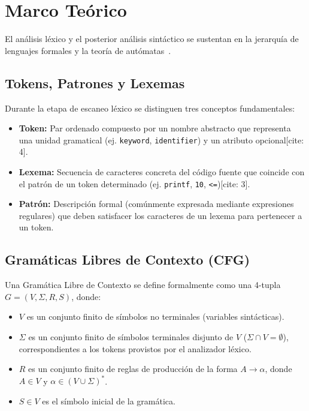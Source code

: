 \documentclass[letterpaper,12pt,oneside]{article}
\begin{document}
\section{Marco Teórico}

El análisis léxico y el posterior análisis sintáctico se sustentan en la jerarquía de lenguajes formales y la teoría de autómatas~\cite{10.5555/576122}.

\subsection{Tokens, Patrones y Lexemas}
Durante la etapa de escaneo léxico se distinguen tres conceptos fundamentales:
\begin{itemize}
    \item \textbf{Token:} Par ordenado compuesto por un nombre abstracto que representa una unidad gramatical (ej. \texttt{keyword}, \texttt{identifier}) y un atributo opcional[cite: 4].
    \item \textbf{Lexema:} Secuencia de caracteres concreta del código fuente que coincide con el patrón de un token determinado (ej. \texttt{printf}, \texttt{10}, \texttt{<=})[cite: 3].
    \item \textbf{Patrón:} Descripción formal (comúnmente expresada mediante expresiones regulares) que deben satisfacer los caracteres de un lexema para pertenecer a un token.
\end{itemize}

\subsection{Gramáticas Libres de Contexto (CFG)}
Una Gramática Libre de Contexto se define formalmente como una 4-tupla $G = (V, \Sigma, R, S)$, donde:
\begin{itemize}
    \item $V$ es un conjunto finito de símbolos no terminales (variables sintácticas).
    \item $\Sigma$ es un conjunto finito de símbolos terminales disjunto de $V$ ($\Sigma \cap V = \emptyset$), correspondientes a los tokens provistos por el analizador léxico.
    \item $R$ es un conjunto finito de reglas de producción de la forma $A \to \alpha$, donde $A \in V$ y $\alpha \in (V \cup \Sigma)^*$.
    \item $S \in V$ es el símbolo inicial de la gramática.
\end{itemize}
\end{document}
